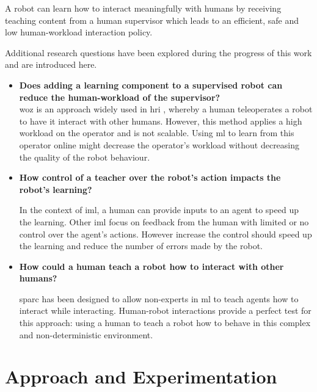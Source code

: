 A robot can learn how to interact meaningfully with humans by receiving teaching
content from a human supervisor which leads to an efficient, safe and
low human-workload interaction policy.

Additional research questions have been explored during the progress of this
work and are introduced here.

\begin{itemize}
    \item \textbf{Does adding a learning component to a supervised robot can reduce the human-workload of the supervisor?}\\
    
        \gls{woz} is an approach widely used in \gls{hri} \citep{riek2012wizard}, whereby a human teleoperates a robot to have it interact with other humans. However, this method applies a high workload on the operator and is not scalable. Using \gls{ml} to learn from this operator online might decrease the operator's workload without decreasing the quality of the robot behaviour.
    
    \item \textbf{How control of a teacher over the robot's action impacts the robot's learning?} 
    
	    In the context of \gls{iml}, a human can provide inputs to an agent to speed up the learning. Other \gls{iml} \citep{thomaz2008teachable,knox2009interactively} focus on feedback from the human with limited or no control over the agent's actions. However increase the control should speed up the learning and reduce the number of errors made by the robot.

    \item \textbf{How could a human teach a robot how to interact with other humans?}

	 \gls{sparc} has been designed to allow non-experts in \gls{ml} to teach agents how to interact while interacting. Human-robot interactions provide a perfect test for this approach: using a human to teach a robot how to behave in this complex and non-deterministic environment.


\end{itemize}

\section{Approach and Experimentation}\label{sec:intro-exps}

